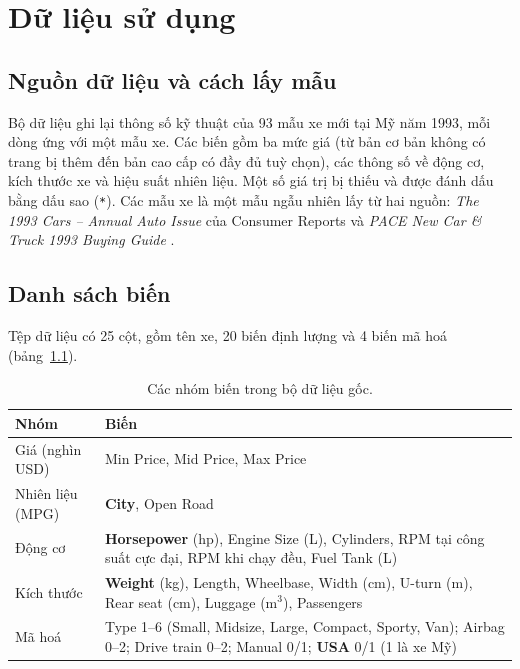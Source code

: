 \documentclass[12pt,a4paper]{report}
\begin{document}
\chapter{Dữ liệu sử dụng}
\label{sec:data}

\section{Nguồn dữ liệu và cách lấy mẫu}

Bộ dữ liệu ghi lại thông số kỹ thuật của 93 mẫu xe mới tại Mỹ năm 1993, mỗi
dòng ứng với một mẫu xe. Các biến gồm ba mức giá (từ bản cơ bản không có trang
bị thêm đến bản cao cấp có đầy đủ tuỳ chọn), các thông số về động cơ, kích
thước xe và hiệu suất nhiên liệu. Một số giá trị bị thiếu và được đánh dấu bằng
dấu sao (\texttt{*}). Các mẫu xe là một mẫu ngẫu nhiên lấy từ hai nguồn:
\emph{The 1993 Cars -- Annual Auto Issue} của Consumer Reports
\cite{consumerreports1993} và \emph{PACE New Car \& Truck 1993 Buying Guide}
\cite{pace1993}.

\section{Danh sách biến}

Tệp dữ liệu có 25 cột, gồm tên xe, 20 biến định lượng và 4 biến mã hoá
(bảng~\ref{tab:variables}).

\begin{table}[tp]
  \centering
  \caption{Các nhóm biến trong bộ dữ liệu gốc.}
  \label{tab:variables}
  \begin{tabular}{l>{\raggedright\arraybackslash}p{12.5cm}}
    \toprule
    Nhóm & Biến \\
    \midrule
    Giá (nghìn USD) & Min Price, Mid Price, Max Price \\
    Nhiên liệu (MPG) & \textbf{City}, Open Road \\
    Động cơ & \textbf{Horsepower} (hp), Engine Size (L), Cylinders, RPM tại công suất cực đại,
      RPM khi chạy đều, Fuel Tank (L) \\
    Kích thước & \textbf{Weight} (kg), Length, Wheelbase, Width (cm), U-turn (m),
      Rear seat (cm), Luggage (m$^3$), Passengers \\
    Mã hoá & Type 1--6 (Small, Midsize, Large, Compact, Sporty, Van); Airbag 0--2;
      Drive train 0--2; Manual 0/1; \textbf{USA} 0/1 (1 là xe Mỹ) \\
    \bottomrule
  \end{tabular}
\end{table}
\end{document}
